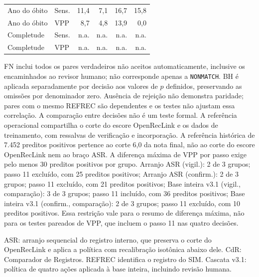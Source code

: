 \begin{table}[htbp]
{\begin{tabular}{llrrrr}
Ano do \'obito & Sens. & 11{,}4 & 7{,}1 & 16{,}7 & 15{,}8 \\
Ano do \'obito & VPP & 8{,}7 & 4{,}8 & 13{,}9 & 0{,}0 \\
Completude & Sens. & n.a. & n.a. & n.a. & n.a. \\
Completude & VPP & n.a. & n.a. & n.a. & n.a. \\
\bottomrule
\end{tabular}}
\par\smallskip
\begin{minipage}{\linewidth}\footnotesize FN inclui todos os pares verdadeiros não aceitos automaticamente, inclusive os encaminhados ao revisor humano; não corresponde apenas a \texttt{NONMATCH}. BH é aplicada separadamente por decisão aos valores de $p$ definidos, preservando as omissões por denominador zero. Ausência de rejeição não demonstra paridade; pares com o mesmo REFREC são dependentes e os testes não ajustam essa correlação. A comparação entre decisões não é um teste formal. A referência operacional compartilha o corte do escore OpenRecLink e os dados de treinamento, com ressalvas de verificação e incorporação. A referência histórica de 7.452 preditos positivos pertence ao corte 6,0 da nota final, não ao corte do escore OpenRecLink nem ao braço ASR. A diferença máxima de VPP por passo exige pelo menos 30 preditos positivos por grupo. Arranjo ASR (vigil.): 2 de 3 grupos; passo 11 excluído, com 25 preditos positivos; Arranjo ASR (confirm.): 2 de 3 grupos; passo 11 excluído, com 21 preditos positivos; Base inteira v3.1 (vigil., comparação): 3 de 3 grupos; passo 11 incluído, com 36 preditos positivos; Base inteira v3.1 (confirm., comparação): 2 de 3 grupos; passo 11 excluído, com 10 preditos positivos. Essa restrição vale para o resumo de diferença máxima, não para os testes pareados de VPP, que incluem o passo 11 nas quatro decisões.\end{minipage}
\par\footnotesize ASR: arranjo sequencial do registro interno, que preserva o corte do OpenRecLink e aplica a política com recalibração isotônica abaixo dele. CdR: Comparador de Registros. REFREC identifica o registro do SIM. Cascata v3.1: política de quatro ações aplicada à base inteira, incluindo revisão humana.
\end{table}
